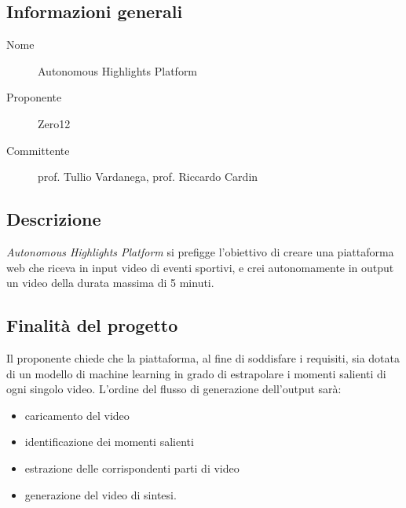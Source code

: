 \documentclass[../studio-di-fattibilita.tex]{subfiles}
\begin{document}
\subsection{Informazioni generali}%
\label{subsec:informazioni_generali}
\begin{description}
  \item[Nome] Autonomous Highlights Platform
  \item[Proponente] Zero12
  \item[Committente] prof. Tullio Vardanega, prof. Riccardo Cardin
\end{description}


\subsection{Descrizione}%
\label{subsec:Descrizione}
\textit{Autonomous Highlights Platform} si prefigge l'obiettivo di creare una piattaforma web che riceva in input video di eventi sportivi, e crei autonomamente in output un video della durata massima di 5 minuti.


\subsection{Finalità del progetto}%
\label{subsec:finalita_del_progetto}
Il proponente chiede che la piattaforma, al fine di soddisfare i requisiti, sia dotata di un modello di machine learning in grado di estrapolare i momenti salienti di ogni singolo video. L'ordine del flusso di generazione dell'output sarà:
\begin{itemize}
  \item caricamento del video
  \item identificazione dei momenti salienti
  \item estrazione delle corrispondenti parti di video
  \item generazione del video di sintesi.
\end{itemize}
\end{document}
